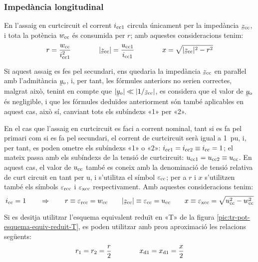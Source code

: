\subsubsection{Impedància longitudinal}

En l'assaig en curtcircuit el corrent $i_\mathrm{cc1}$ circula
únicament per la impedància $\cmplx{z}\ped{cc}$, i tota la potència
$w_\mathrm{cc}$ és consumida per $r$; amb aquestes consideracions tenim:
\begin{equation}
    r = \frac{w\ped{cc}}{i\ped{cc1}^2} \qquad\qquad
    |\cmplx{z}\ped{cc}| = \frac{u\ped{cc1}}{i\ped{cc1}} \qquad\qquad
    x = \sqrt{|\cmplx{z}\ped{cc}|^2 - r^2}
\end{equation}

Si aquest assaig es fes pel secundari, ens quedaria la impedància
$\cmplx{z}\ped{cc}$ en paraŀlel amb l'admitància
$\cmplx{y}\ped{o}$, i, per tant, les fórmules anteriors no serien
correctes, malgrat això, tenint en compte que $|\cmplx{y}\ped{o}| \ll
|1/\cmplx{z}\ped{cc}|$, es considera que el valor de
$\cmplx{y}\ped{o}$ és negligible, i que les fórmules deduïdes
anteriorment són també aplicables en aquest cas, això sí, canviant
tots els subíndexs «1» per «2».

En el cas que l'assaig en curtcircuit es faci a corrent nominal,
tant  si es fa pel primari  com si es fa pel secundari, el corrent
de curtcircuit serà igual a \qty{1}{pu}, i, per tant, es poden ometre els
subíndexs «1» o «2»: $i_\mathrm{cc1} = i_\mathrm{cc2} \equiv i_\mathrm{cc} = 1$;
el mateix passa amb els subíndexs de la tensió de curtcircuit:
$u_\mathrm{cc1} = u_\mathrm{cc2} \equiv u_\mathrm{cc}$. En aquest cas, el valor
de $u_\mathrm{cc}$ també es coneix amb la denominació de
tensió relativa de curt  circuit en tant per u, i s'utilitza  el
símbol $\varepsilon_\mathrm{cc}$; per a $r$ i $x$ s'utilitzen també els
símbols $\varepsilon_\mathrm{rcc}$ i $\varepsilon_\mathrm{xcc}$
respectivament. Amb aquestes consideracions tenim:
\begin{equation}
    i\ped{cc} = 1 \qquad \Rightarrow \qquad r \equiv \varepsilon\ped{rcc} = w\ped{cc} \qquad
    |\cmplx{z}\ped{cc}| \equiv \varepsilon\ped{cc} = u\ped{cc} \qquad
    x \equiv \varepsilon\ped{xcc} = \sqrt{u\ped{cc}^2 - w\ped{cc}^2}
    \label{eq:assaig-cc-nomianl}
\end{equation}

Si es desitja utilitzar l'esquema equivalent reduït en «T» de la figura \vref{pic:tr-pot-esquema-equiv-reduit-T}, es poden utilitzar amb prou aproximació les relacions següents:
\begin{equation}
    r_1 = r_2 = \frac{r}{2} \qquad\qquad x_\mathrm{d1} = x_\mathrm{d1} = \frac{x}{2}
\end{equation}


